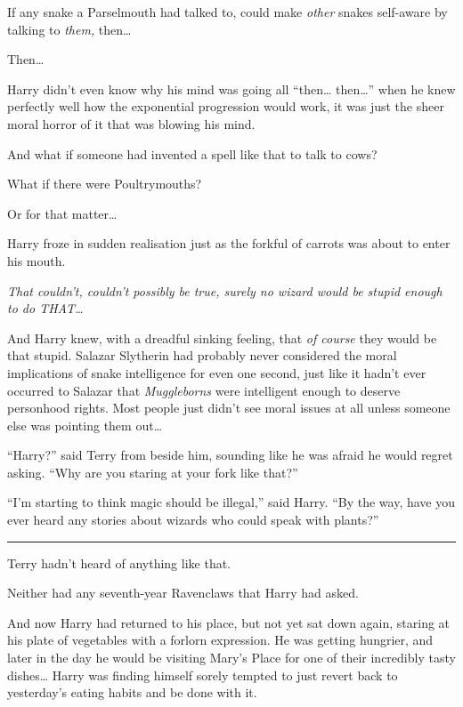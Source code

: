 If any snake a Parselmouth had talked to, could make \emph{other} snakes
self-aware by talking to \emph{them,} then\ldots{}

Then\ldots{}

Harry didn't even know why his mind was going all ``then\ldots{}
then\ldots{}'' when he knew perfectly well how the exponential
progression would work, it was just the sheer moral horror of it that
was blowing his mind.

And what if someone had invented a spell like that to talk to cows?

What if there were Poultrymouths?

Or for that matter\ldots{}

Harry froze in sudden realisation just as the forkful of carrots was
about to enter his mouth.

\emph{That couldn't, couldn't possibly be true, surely no wizard would
be stupid enough to do THAT\ldots{}}

And Harry knew, with a dreadful sinking feeling, that \emph{of course}
they would be that stupid. Salazar Slytherin had probably never
considered the moral implications of snake intelligence for even one
second, just like it hadn't ever occurred to Salazar that
\emph{Muggleborns} were intelligent enough to deserve personhood rights.
Most people just didn't see moral issues at all unless someone else was
pointing them out\ldots{}

``Harry?'' said Terry from beside him, sounding like he was afraid he
would regret asking. ``Why are you staring at your fork like that?''

``I'm starting to think magic should be illegal,'' said Harry. ``By the
way, have you ever heard any stories about wizards who could speak with
plants?''

\begin{center}\rule{3in}{0.4pt}\end{center}

Terry hadn't heard of anything like that.

Neither had any seventh-year Ravenclaws that Harry had asked.

And now Harry had returned to his place, but not yet sat down again,
staring at his plate of vegetables with a forlorn expression. He was
getting hungrier, and later in the day he would be visiting Mary's Place
for one of their incredibly tasty dishes\ldots{} Harry was finding
himself sorely tempted to just revert back to yesterday's eating habits
and be done with it.


